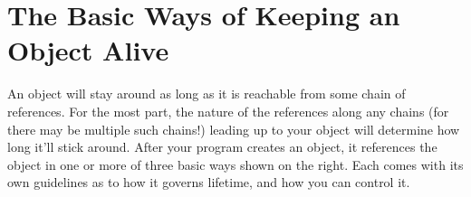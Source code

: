\section{The Basic Ways of Keeping an Object Alive}
\begin{figure}
\centering
{}
\end{figure}
An object will stay around as long as it is reachable from some chain of
references. For the most part, the nature of the references along any
chains (for there may be multiple such chains!) leading up to your object will
determine how long it'll stick around.
After your program creates an object, it references the object in one or more of
three basic ways shown on the right.
Each comes with its own guidelines as to how it governs lifetime, and how you
can control it.


